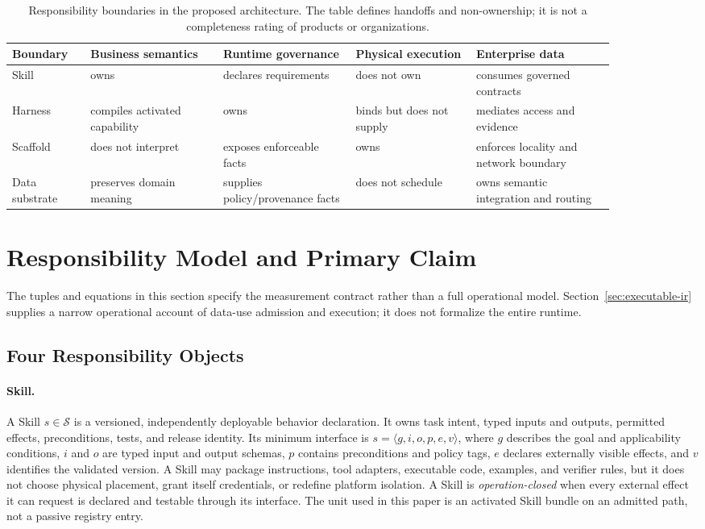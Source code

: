 \documentclass[11pt]{article}
\begin{document}
\begin{table}[t]
\centering
\caption{Responsibility boundaries in the proposed architecture. The table defines handoffs and non-ownership; it is not a completeness rating of products or organizations.}
\label{tab:responsibility-boundary}
\begin{tabular}{lp{0.22\linewidth}p{0.22\linewidth}p{0.20\linewidth}p{0.23\linewidth}}
\hline
Boundary & Business semantics & Runtime governance & Physical execution & Enterprise data \\
\hline
Skill & owns & declares requirements & does not own & consumes governed contracts \\
Harness & compiles activated capability & owns & binds but does not supply & mediates access and evidence \\
Scaffold & does not interpret & exposes enforceable facts & owns & enforces locality and network boundary \\
Data substrate & preserves domain meaning & supplies policy/provenance facts & does not schedule & owns semantic integration and routing \\
\hline
\end{tabular}
\end{table}

\section{Responsibility Model and Primary Claim}
\label{sec:model}

The tuples and equations in this section specify the measurement contract rather than a full operational model. Section~\ref{sec:executable-ir} supplies a narrow operational account of data-use admission and execution; it does not formalize the entire runtime.

\subsection{Four Responsibility Objects}
\label{sec:runtime-objects}

\paragraph{Skill.}
A Skill $s\in\mathcal{S}$ is a versioned, independently deployable behavior declaration. It owns task intent, typed inputs and outputs, permitted effects, preconditions, tests, and release identity. Its minimum interface is $s=\langle g,i,o,p,e,v\rangle$, where $g$ describes the goal and applicability conditions, $i$ and $o$ are typed input and output schemas, $p$ contains preconditions and policy tags, $e$ declares externally visible effects, and $v$ identifies the validated version. A Skill may package instructions, tool adapters, executable code, examples, and verifier rules, but it does not choose physical placement, grant itself credentials, or redefine platform isolation. A Skill is \textit{operation-closed} when every external effect it can request is declared and testable through its interface. The unit used in this paper is an activated Skill bundle on an admitted path, not a passive registry entry.
\end{document}
